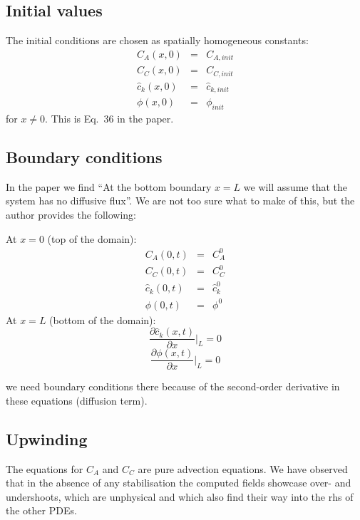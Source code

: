 \documentclass[a4paper]{article}
\begin{document}
\subsection*{Initial values}

The initial conditions are chosen as spatially homogeneous constants:
\begin{eqnarray}
C_A(x,0)&=&C_{A,init} \\
C_C(x,0)&=&C_{C,init} \\
\hat{c}_k(x,0)&=&\hat{c}_{k,init} \\
\phi(x,0) &=& \phi_{init}
\end{eqnarray}
for $x\ne 0$. This is Eq.~36 in the paper.

\subsection*{Boundary conditions}

In the paper we find ``At the bottom boundary $x=L$ we will assume that the system has no diffusive flux''.
We are not too sure what to make of this, but the author provides the following:

At $x=0$ (top of the domain):
\begin{eqnarray}
C_A(0,t)&=&C_{A}^0 \\
C_C(0,t)&=&C_{C}^0 \\
\hat{c}_k(0,t)&=&\hat{c}_{k}^0 \\
\phi(0,t) &=& \phi^0
\end{eqnarray}
At $x=L$ (bottom of the domain):
\[
\frac{\partial \hat{c}_k (x,t)}{\partial x}|_L = 0
\]
\[
\frac{\partial \phi (x,t)}{\partial x}|_L = 0
\]

we need boundary conditions there because of the second-order 
derivative in these equations (diffusion term).

\subsection*{Upwinding}

The equations for $C_A$ and $C_C$ are pure advection equations. 
We have observed that in the absence of any stabilisation the computed fields
showcase over- and undershoots, which are unphysical and which also find their
way into the rhs of the other PDEs. 
\end{document}

